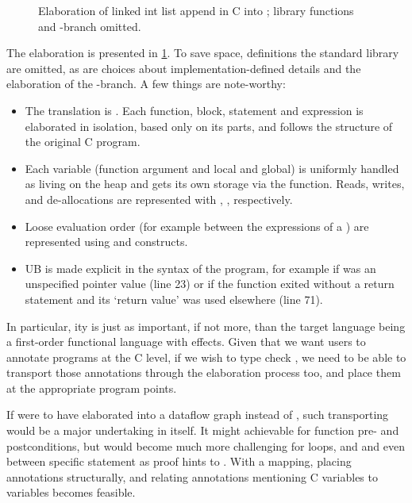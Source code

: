 \begin{figure}[p]
    \centering
    \begin{minipage}{1.2\textwidth}
    \end{minipage}
    \caption{Elaboration of linked int list append in C into
         ; library functions and -branch
        omitted.}\label{fig:append-core}
\end{figure}%

The elaboration is presented in \cref{fig:append-core}. To save space,
definitions the  standard library are omitted, as are choices about
implementation-defined details and the elaboration of the
-branch. A few things are note-worthy:
\begin{itemize}
    \item The translation is . Each function, block,
        statement and expression is elaborated in isolation, based only
        on its parts, and follows the structure of the original C program.
    \item Each variable (function argument and local and global) is uniformly
        handled as living on the heap and gets its own storage via the
         function. Reads, writes, and de-allocations are
        represented with , ,
         respectively.
    \item Loose evaluation order (for example between the expressions of a \cinline{==})
        are represented using  and  constructs.
    \item UB is made explicit in the syntax of the program, for example if  was
        an unspecified pointer value (line 23) or if the function exited without a return statement
        and its `return value' was used elsewhere (line 71).
\end{itemize}

In particular, ity is just as important, if not more, than the
target language being a first-order functional language with effects. Given
that we want users to annotate programs at the C level, if we wish to type
check , we need to be able to transport those annotations through the
elaboration process too, and place them at the appropriate program points.

If  were to have elaborated into a dataflow graph instead of ,
such transporting would be a major undertaking in itself. It might achievable
for function pre- and postconditions, but would become much more challenging
for loops, and  and even between specific statement as proof
hints to . With a  mapping, placing annotations
structurally, and relating annotations mentioning C variables to 
variables becomes feasible.

